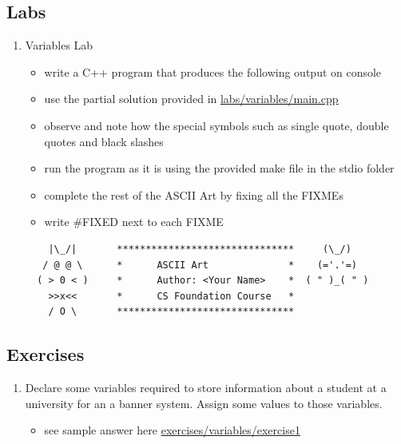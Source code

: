 \documentclass[11pt]{article}
\providecommand{\tightlist}{%
      \setlength{\itemsep}{0pt}\setlength{\parskip}{0pt}}
\begin{document}
    \hypertarget{labs}{%
\subsection{Labs}\label{labs}}

\begin{enumerate}
\def\labelenumi{\arabic{enumi}.}
\tightlist
\item
  Variables Lab

  \begin{itemize}
  \tightlist
  \item
    write a C++ program that produces the following output on console
  \item
    use the partial solution provided in \url{labs/variables/main.cpp}
  \item
    observe and note how the special symbols such as single quote,
    double quotes and black slashes
  \item
    run the program as it is using the provided make file in the stdio
    folder
  \item
    complete the rest of the ASCII Art by fixing all the FIXMEs
  \item
    write \#FIXED next to each FIXME
  \end{itemize}

\begin{verbatim}
    |\_/|       *******************************     (\_/)
   / @ @ \      *      ASCII Art              *    (='.'=)
  ( > 0 < )     *      Author: <Your Name>    *  ( " )_( " )
    >>x<<       *      CS Foundation Course   *
    / O \       *******************************
\end{verbatim}
\end{enumerate}

    \hypertarget{exercises}{%
\subsection{Exercises}\label{exercises}}

\begin{enumerate}
\def\labelenumi{\arabic{enumi}.}
\tightlist
\item
  Declare some variables required to store information about a student
  at a university for an a banner system. Assign some values to those
  variables.

  \begin{itemize}
  \tightlist
  \item
    see sample answer here \url{exercises/variables/exercise1}
  \end{itemize}
\end{enumerate}
\end{document}
